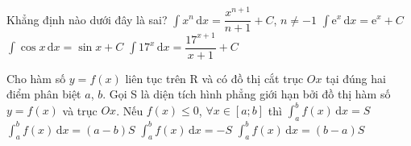\begin{ex}%
	Khẳng  định nào dưới đây là sai?
	 \choice
		{$\displaystyle\int x^n\mathrm{\,d}x=\dfrac{x^{n+1}}{n+1}+C$,  $n\neq -1$}
		 {$\displaystyle\int \mathrm{e}^x\mathrm{\,d}x=\mathrm{e}^x+C$}
		{$\displaystyle\int \cos x\mathrm{\,d}x=\sin x+C$} 
		{\True  $\displaystyle\int 17^x\mathrm{\,d}x=\dfrac{17^{x+1}}{x+1}+C$}
\end{ex}

\begin{ex}%
	 Cho hàm số $y=f(x)$ liên tục trên $\mathrm{R}$ và có đồ thị cắt trục $Ox$ tại đúng hai điểm phân biệt $a$, $b$. Gọi S là diện tích hình phẳng giới hạn bởi đồ thị hàm số $y=f(x)$ và trục $Ox$. Nếu $f(x)\le 0$, $\forall x\in \left[a;b \right]$ thì
	\choice 
		{$\displaystyle\int_a^b  f(x)\mathrm{\,d}x =S$}
		{$\displaystyle\int_a^b f(x)\mathrm{\,d}x  =(a-b)S$}
		{\True  $\displaystyle\int_a^b f(x)\mathrm{\,d}x =-S$}
		{$\displaystyle\int_a^b f(x)\mathrm{\,d}x  =(b-a)S$}
\end{ex}
